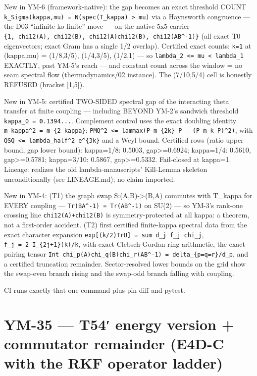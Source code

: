 New in YM-6 (framework-native): the gap becomes an exact threshold COUNT
\texttt{k\_Sigma(kappa,mu)\ =\ N(spec(T\_kappa)\ \textgreater{}\ mu)} via a Haynsworth congruence ---
the D03 ``infinite ko finite'' move --- on the native 5x5 carrier
\texttt{\{1,\ chi12(A),\ chi12(B),\ chi12(A)chi12(B),\ chi12(AB\^{}-1)\}} (all exact T0
eigenvectors; exact Gram has a single 1/2 overlap). Certified exact counts:
\texttt{k=1} at (kappa,mu) = (1/8,3/5), (1/4,3/5), (1/2,1) --- so
\texttt{lambda\_2\ \textless{}=\ mu\ \textless{}\ lambda\_1} EXACTLY, past YM-5's reach --- and constant
count across the window = no seam spectral flow (thermodynamics/02
instance). The (7/10,5/4) cell is honestly REFUSED (bracket {[}1,5{]}).

New in YM-5: certified TWO-SIDED spectral gap of the interacting theta
transfer at finite coupling --- including BEYOND YM-2's sandwich threshold
\texttt{kappa\_0\ =\ 0.1394...}. Complement control uses the exact doubling identity
\texttt{m\_kappa\^{}2\ =\ m\_\{2\ kappa\}}: \texttt{\textbar{}PMQ\textbar{}\^{}2\ \textless{}=\ lammax(P\ m\_\{2k\}\ P\ -\ (P\ m\_k\ P)\^{}2)},
with \texttt{\textbar{}QSQ\textbar{}\ \textless{}=\ lambda\_half\^{}2\ e\^{}\{3k\}} and a Weyl bound. Certified rows
(ratio upper bound, gap lower bound): kappa=1/8: 0.5003, gap\textgreater=0.6924;
kappa=1/4: 0.5610, gap\textgreater=0.5781; kappa=3/10: 0.5867, gap\textgreater=0.5332.
Fail-closed at kappa=1. Lineage: realizes the old lambda-manuscripts'
Kill-Lemma skeleton unconditionally (see LINEAGE.md); no claim imported.

New in YM-4: (T1) the graph swap S:(A,B)-\textgreater(B,A) commutes with T\_kappa for
EVERY coupling --- \texttt{Tr(BA\^{}-1)\ =\ Tr(AB\^{}-1)} on SU(2) --- so YM-3's rank-one
crossing line \texttt{chi12(A)+chi12(B)} is symmetry-protected at all kappa: a
theorem, not a first-order accident. (T2) first certified finite-kappa
spectral data from the exact character expansion
\texttt{exp{[}(k/2)TrU{]}\ =\ sum\ d\_j\ f\_j\ chi\_j}, \texttt{f\_j\ =\ 2\ I\_\{2j+1\}(k)/k}, with exact
Clebsch-Gordan ring arithmetic, the exact pairing tensor
\texttt{Int\ chi\_p(A)chi\_q(B)chi\_r(AB\^{}-1)\ =\ delta\_\{p=q=r\}/d\_p}, and a certified
truncation remainder. Sector-resolved lower bounds on the grid show the
swap-even branch rising and the swap-odd branch falling with coupling.

CI runs exactly that one command plus pin diff and pytest.

\hypertarget{ym-35-t54-energy-version-commutator-remainder-e4d-c-with-the-rkf-operator-ladder}{%
\section{YM-35 --- T54′ energy version + commutator remainder (E4D-C with the RKF operator ladder)}\label{ym-35-t54-energy-version-commutator-remainder-e4d-c-with-the-rkf-operator-ladder}}


